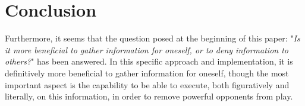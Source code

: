 \section{Conclusion}\label{sec:conclusion}
Furthermore, it seems that the question posed at the 
beginning of this paper: "\textit{Is it more beneficial 
to gather information for oneself, or to deny 
information to others?}" has been answered. In this 
specific approach and implementation, it is 
definitively more beneficial to gather information for 
oneself, though the most important aspect is the 
capability to be able to execute, both figuratively and 
literally, on this information, in order to remove 
powerful opponents from play. 